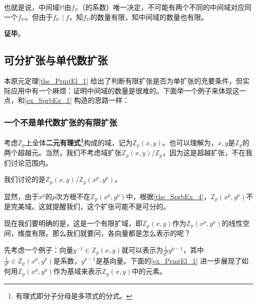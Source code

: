 也就是说，中间域$\mathbb{M}$由$f_\mathbb{M}$（的系数）唯一决定，不可能有两个不同的中间域对应同一个$f_{\mathbb{M}}$。但由于$f_\mathbb{M}\mid f$，知$f_\mathbb{M}$的数量有限，知中间域的数量也有限。

\textbf{证毕}。


\subsection{可分扩张与单代数扩张}


本原元定理\autoref{the_PrmtEl_1} 给出了判断有限扩张是否为单扩张的充要条件，但实际应用中有一个麻烦：证明中间域的数量是很难的。下面举一个例子来体现这一点，和\autoref{ex_SprbEx_1} 构造的思路一样：

\subsubsection{一个不是单代数扩张的有限扩张}

考虑$\mathbb{Z}_p$上全体\textbf{二元有理式\footnote{有理式即分子分母是多项式的分式。}}构成的域，记为$\mathbb{Z}_p(x, y)$。也可以理解为，$x, y$是$\mathbb{Z}_p$的两个超越元。当然，我们不考虑域扩张$\mathbb{Z}_p(x, y)/\mathbb{Z}_p$，因为这是超越扩张，不在我们讨论范围内。

我们讨论的是$\mathbb{Z}_p(x, y)/\mathbb{Z}_p(x^p, y^p)$。

显然，由于$x^p$的$p$次方根不在$\mathbb{Z}_p(x^p, y^p)$中，根据\autoref{the_SprbEx_4}，$\mathbb{Z}_p(x^p, y^p)$不是完美域。这就提醒我们，这个扩张可能不是可分的。

现在我们要明确的是，这是一个有限扩域，即$\mathbb{Z}_p(x, y)$作为$\mathbb{Z}_p(x^p, y^p)$的线性空间，维度有限。那么我们就要问，各向量都是怎么表示的呢？

先考虑一个例子：向量$y^{-1}\in\mathbb{Z}_p(x, y)$就可以表示为$\frac{1}{y^p}y^{p-1}$，其中$\frac{1}{y^p}\in\mathbb{Z}_p(x^p, y^p)$是系数，$y^{p-1}$是基向量。下面的\autoref{ex_PrmtEl_1} 进一步展现了如何用$\mathbb{Z}_p(x^p, y^p)$作为基域来表示$\mathbb{Z}_p(x, y)$中的元素。

